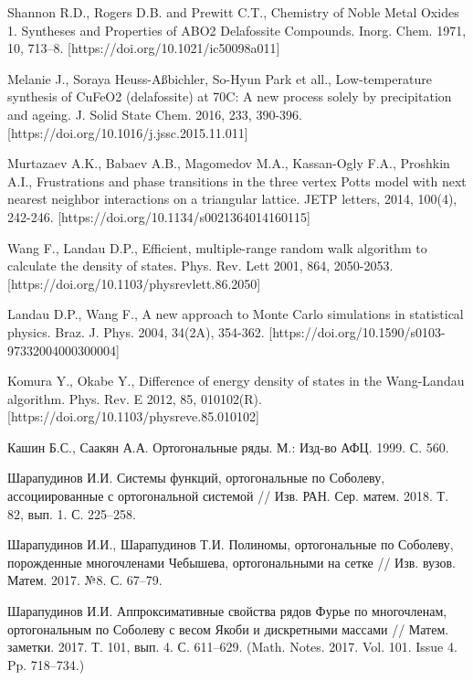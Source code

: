 \begin{thebibliography}{111}
Shannon R.D., Rogers D.B. and Prewitt C.T., Chemistry of Noble Metal Oxides 1. Syntheses and Properties of ABO2 Delafossite Compounds. Inorg. Chem. 1971, 10, 713–8. [https://doi.org/10.1021/ic50098a011]

Melanie J., Soraya Heuss-Aßbichler, So-Hyun Park et all., Low-temperature synthesis of CuFeO2 (delafossite) at 70C: A new process solely by precipitation and ageing. J. Solid State Chem. 2016, 233, 390-396. [https://doi.org/10.1016/j.jssc.2015.11.011]

Murtazaev A.K., Babaev A.B., Magomedov M.A., Kassan-Ogly F.A., Proshkin A.I., Frustrations and phase transitions in the three vertex Potts model with next nearest neighbor interactions on a triangular lattice. JETP letters, 2014, 100(4), 242-246. [https://doi.org/10.1134/s0021364014160115]

Wang F., Landau D.P., Efficient, multiple-range random walk algorithm to calculate the density of states. Phys. Rev. Lett 2001, 864, 2050-2053. [https://doi.org/10.1103/physrevlett.86.2050]

Landau D.P., Wang F., A new approach to Monte Carlo simulations in statistical physics. Braz. J. Phys. 2004, 34(2A), 354-362. [https://doi.org/10.1590/s0103-97332004000300004]

Komura Y., Okabe Y., Difference of energy density of states in the Wang-Landau algorithm. Phys. Rev. E 2012, 85, 010102(R). [https://doi.org/10.1103/physreve.85.010102]








Кашин Б.С., Саакян А.А. Ортогональные ряды. М.: Изд-во АФЦ. 1999. С. 560.

Шарапудинов И.И. Системы функций, ортогональные по Соболеву, ассоциированные с ортогональной системой // Изв. РАН. Сер. матем. 2018. Т. 82, вып. 1. С. 225--258.

Шарапудинов И.И., Шарапудинов Т.И. Полиномы, ортогональные по Соболеву, порожденные многочленами Чебышева, ортогональными на сетке // Изв. вузов. Матем. 2017. №8. С. 67--79.

Шарапудинов И.И. Аппроксимативные свойства рядов Фурье по многочленам, ортогональным по Соболеву с весом Якоби и дискретными массами // Матем. заметки. 2017. Т. 101, вып. 4. С. 611--629. (Math. Notes. 2017. Vol. 101. Issue 4. Pp. 718--734.)


\end{thebibliography}
